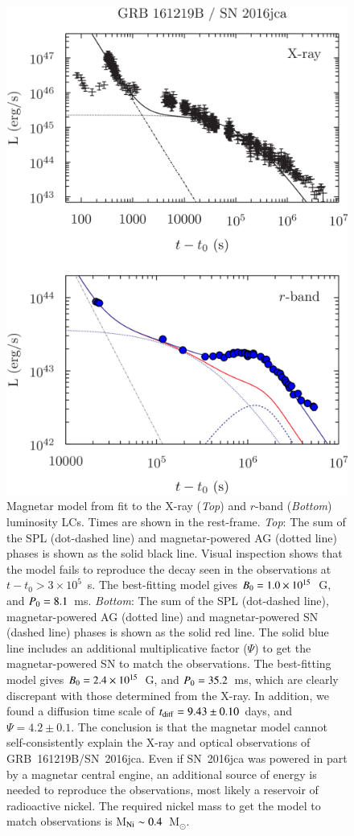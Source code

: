 \documentclass[traditabstract,longauth]{aa}
\begin{document}
\begin{figure}
\includegraphics[width=\columnwidth]{Fig13_2016jca_Magnetar-eps-converted-to.pdf}
      \caption{Magnetar model from \citet{CJM16} fit to the X-ray (\textit{Top}) and $r$-band (\textit{Bottom}) luminosity LCs. Times are shown in the rest-frame.   \textit{Top}: The sum of the SPL (dot-dashed line) and magnetar-powered AG (dotted line) phases is shown as the solid black line. Visual inspection shows that the model fails to reproduce the decay seen in the observations at $t-t_0>3\times10^5$~s.  The best-fitting model gives $B_{\rm 0} = 1.0\times 10^{15}$~G, and $P_{\rm 0} = 8.1$~ms.  \textit{Bottom}: The sum of the SPL (dot-dashed line), magnetar-powered AG (dotted line) and magnetar-powered SN (dashed line) phases is shown as the solid red line.  The solid blue line includes an additional multiplicative factor ($\Psi$) to get the magnetar-powered SN to match the observations.  The best-fitting model gives $B_{\rm 0} = 2.4\times 10^{15}$~G, and $P_{\rm 0} = 35.2$~ms, which are clearly discrepant with those determined from the X-ray.  In addition, we found a diffusion time scale of $t_{\rm diff} = 9.43\pm0.10$~days, and $\Psi = 4.2\pm0.1$.  The conclusion is that the magnetar model cannot self-consistently explain the X-ray and optical observations of GRB~161219B/SN~2016jca.  Even if SN~2016jca was powered in part by a magnetar central engine, an additional source of energy is needed to reproduce the observations, most likely a reservoir of radioactive nickel.  The required nickel mass to get the model to match observations is M$_{\rm Ni} \sim 0.4$~M$_{\odot}$.}

\end{figure}
\end{document}
